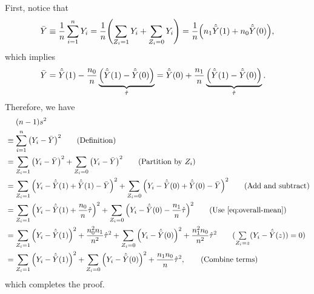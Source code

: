 \documentclass[10pt]{article}
\begin{document}
First,
notice that 
\begin{align*}
  \bar{Y} \equiv \frac{1}{n} \sum_{i=1}^n Y_i 
  = \frac{1}{n} {\left( \sum_{Z_i=1} Y_i + \sum_{Z_i=0} Y_i \right)}
  = \frac{1}{n} {\left( n_1 \hat{\bar{Y}}(1) + n_0 \hat{\bar{Y}}(0) \right)},
\end{align*}
which implies
\begin{align}
  \bar{Y} 
  &= \hat{\bar{Y}}(1) 
  - \frac{n_0}{n} \underbrace{{\left( \hat{\bar{Y}}(1) - \hat{\bar{Y}}(0) \right)}}_{\hat{\tau}}
  = \hat{\bar{Y}}(0)
  + \frac{n_1}{n} \underbrace{{\left( \hat{\bar{Y}}(1) - \hat{\bar{Y}}(0) \right)}}_{\hat{\tau}}. 
    \label{eq:overall-mean}
\end{align}
Therefore, we have
\begin{align*}
  &\mathrel{\phantom{=}} (n - 1) s^2 \\
  &\equiv \sum_{i = 1}^n \bp{Y_i - \bar{Y}}^2 \tag{Definition}\\
  &= \sum_{Z_i = 1} \bp{Y_i - \bar{Y}}^2 + \sum_{Z_i = 0} \bp{Y_i - \bar{Y}}^2 \tag{Partition by $Z_i$} \\
  &= \sum_{Z_i = 1} \bp{Y_i - \hat{\bar{Y}}(1) + \hat{\bar{Y}}(1) - \bar{Y}}^2 
    + \sum_{Z_i = 0} \bp{Y_i - \hat{\bar{Y}}(0) + \hat{\bar{Y}}(0) - \bar{Y}}^2 \tag{Add and subtract} \\
  &= \sum_{Z_i = 1} \bp{Y_i - \hat{\bar{Y}}(1) + \frac{n_0}{n} \hat{\tau}}^2
    + \sum_{Z_i = 0} \bp{Y_i - \hat{\bar{Y}}(0) - \frac{n_1}{n} \hat{\tau}}^2
    \tag{Use \cref{eq:overall-mean}} \\
  &= \sum_{Z_i = 1} \bp{Y_i - \hat{\bar{Y}}(1)}^2 + \frac{n_0^2 n_1}{n^2} \hat{\tau}^2 
    + \sum_{Z_i = 0} \bp{Y_i - \hat{\bar{Y}}(0)}^2 + \frac{n_1^2 n_0}{n^2} \hat{\tau}^2
    \tag{$\sum\limits_{Z_i = z}(Y_i - \hat{\bar{Y}}(z)) = 0$} \\
  &= \sum_{Z_i = 1} \bp{Y_i - \hat{\bar{Y}}(1)}^2 
    + \sum_{Z_i = 0} \bp{Y_i - \hat{\bar{Y}}(0)}^2
    + \frac{n_1 n_0}{n} \hat{\tau}^2,
    \tag{Combine terms}
\end{align*}
which completes the proof.



\printglossaries
\end{document}
